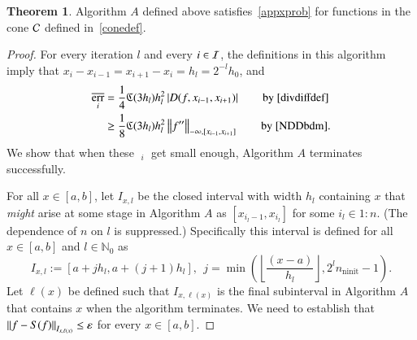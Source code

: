 \documentclass[review]{elsarticle}
\newcommand{\abstol}{\varepsilon}
\newcommand{\oton}{1\!:\!n}
\theoremstyle{definition}
\newcommand{\Ixl}{I_{x,l}}
\DeclareMathOperator{\ninit}{ninit}
\DeclareMathOperator{\oerr}{\overline{err}}
\newtheorem{theorem}{Theorem}
\begin{document}
\begin{theorem} \label{thm:algAworks}
	Algorithm $A$ defined above satisfies~\eqref{appxprob} for functions in the
	cone $\mathcal{C}$ defined in~\eqref{conedef}.
\end{theorem}

\begin{proof}
For every iteration $l$ and every $i \in \mathcal{I}$, the definitions in this algorithm
imply that $x_i-x_{i-1} = x_{i+1} - x_i = h_l = 2^{-l}h_0$, and
	\begin{align}
	\oerr_i
	& =  \frac{1}{4} \fC(3h_l) h_l^2 \abs{D(f,x_{i-1},x_{i+1})}
	\qquad \text{by \eqref{divdiffdef}}  \label{divdiffbd}\\
	& \ge \frac{1} 8 \fC(3h_l) h_l^2 \norm[-\infty,{[x_{i-1},x_{i+1}]}]{f''}
	\qquad \text{by \eqref{NDDbdm}}. \label{oerrlobd}
	\end{align}
We show that when these $\oerr_i$ get small enough, Algorithm $A$ terminates
successfully.

For all $x \in [a,b]$, let $\Ixl$ be the closed interval with width $h_l$
containing $x$ that \emph{might} arise at some stage in Algorithm $A$ as $[x_{i_l-1},
x_{i_l}]$ for some $i_l \in \oton$. (The dependence of $n$ on $l$ is
suppressed.) Specifically this interval is defined for all $ x \in [a,b]$ and $l
\in \mathbb{N}_0$ as
	\begin{equation}\label{Ixldef}
	\Ixl := \left[a+jh_l,a+(j+1) h_l\right], \ \ j=\min \left(\left\lfloor\frac{(x-a)}{h_l}\right\rfloor,
	2^l n_{\ninit}-1 \right ).
	\end{equation}
Let $\ell(x)$ be defined such that $I_{x,\ell(x)}$ is the final subinterval in
Algorithm $A$ that contains $x$ when the algorithm terminates. We need to
establish that $\norm[I_{x,\ell(x)}]{f - S(f)} \le \abstol$ for every $x \in
[a,b]$.


\end{proof}
\end{document}
